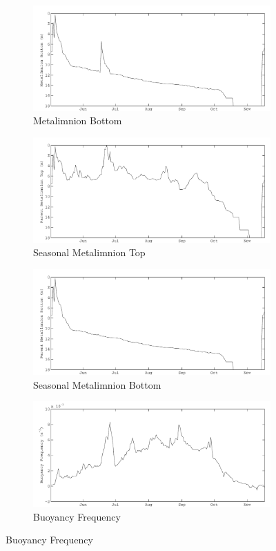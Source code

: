 \begin{figure}
\begin{subfigure}{\lafigsize}
			\caption{\label{fig:la:out:metaB}Metalimnion Bottom}
			\includegraphics[width=\textwidth]{figures/Sparkling_metaB.pdf}
		\end{subfigure}
		\begin{subfigure}{\lafigsize}
			\caption{\label{fig:la:out:SmetaT}Seasonal Metalimnion Top}
			\includegraphics[width=\textwidth]{figures/Sparkling_SmetaT.pdf}
		\end{subfigure}
		\begin{subfigure}{\lafigsize}
			\caption{\label{fig:la:out:SmetaB}Seasonal Metalimnion Bottom}
			\includegraphics[width=\textwidth]{figures/Sparkling_SmetaB.pdf}
		\end{subfigure}
		\begin{subfigure}{\lafigsize}
			\caption{\label{fig:la:out:N2}Buoyancy Frequency}
			\includegraphics[width=\textwidth]{figures/Sparkling_N2.pdf}

\end{subfigure}
\end{figure}
